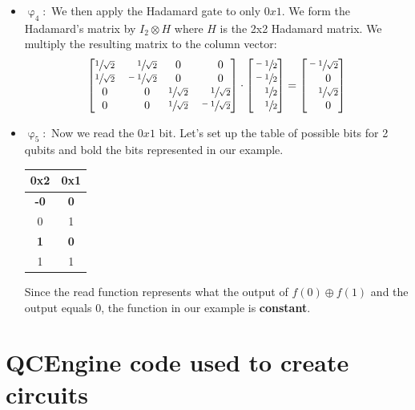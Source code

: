 \documentclass[12pt]{article}
\theoremstyle{definition}
\begin{document}
\begin{itemize}
\item $\upvarphi_4:$ We then apply the Hadamard gate to only $0x1$. We form the Hadamard's matrix by $I_2 \otimes H$ where $H$ is the 2x2 Hadamard matrix. We multiply the resulting matrix to the column vector:
\[
\begin{bmatrix}
\sfrac{1}{\sqrt{2}}&\quad\sfrac{1}{\sqrt{2}}&0&\quad0\\
\sfrac{1}{\sqrt{2}}&\sfrac{-1}{\sqrt{2}}&0&\quad0\\
0&\quad0&\sfrac{1}{\sqrt{2}}&\quad\sfrac{1}{\sqrt{2}}\\
0&\quad0&\sfrac{1}{\sqrt{2}}&\sfrac{-1}{\sqrt{2}}\\
\end{bmatrix}
\cdot
\begin{bmatrix}
\sfrac{-1}{2}\\
\sfrac{-1}{2}\\
\quad\sfrac{1}{2}\\
\quad\sfrac{1}{2}\\
\end{bmatrix}
=
\begin{bmatrix}
\sfrac{-1}{\sqrt{2}}\\
\quad0\\
\quad\sfrac{1}{\sqrt{2}}\\
\quad0\\
\end{bmatrix}
\]
\item $\upvarphi_5:$ Now we read the $0x1$ bit. Let's set up the table of possible bits for 2 qubits and bold the bits represented in our example. 

\begin{center}
\begin{tabular}{|c|c|} 
 \hline
 0x2&0x1 \\ 
 \hline
 \textbf{-0}&\textbf{0} \\ 
 0&1\\ 
 \textbf{1}&\textbf{0}\\
 1&1\\
 \hline
\end{tabular}
\end{center}

Since the read function represents what the output of $f(0) \oplus f(1)$ and the output equals 0, the function in our example is \textbf{constant}.
\end{itemize}


\clearpage
\section{QCEngine code used to create circuits}
\end{document}
